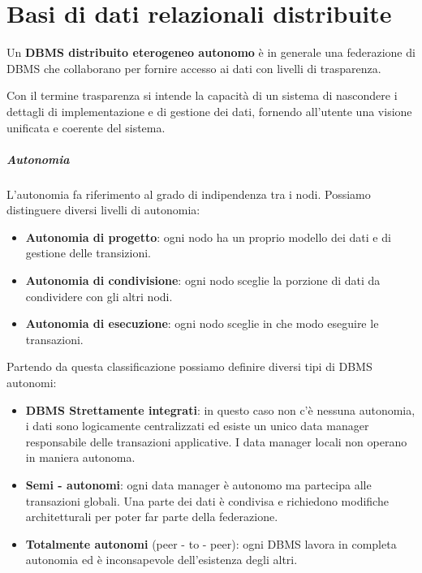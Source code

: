 \chapter{Basi di dati relazionali distribuite}
\begin{definizione}
      Un \textbf{DBMS distribuito eterogeneo autonomo} è in generale una
      federazione di DBMS che collaborano per fornire accesso ai dati con livelli
      di trasparenza.
\end{definizione}
Con il termine trasparenza si intende la capacità di un sistema di
nascondere i dettagli di implementazione e di gestione dei dati, fornendo
all'utente una visione unificata e coerente del sistema.
\paragraph{Autonomia} L'autonomia fa riferimento al grado di indipendenza tra i
nodi. Possiamo distinguere diversi livelli di autonomia:
\begin{itemize}
      \item \textbf{Autonomia di progetto}: ogni nodo ha un proprio modello dei
            dati e di gestione delle transizioni.
      \item \textbf{Autonomia di condivisione}: ogni nodo sceglie la porzione di
            dati da condividere con gli altri nodi.
      \item \textbf{Autonomia di esecuzione}: ogni nodo sceglie in che modo eseguire
            le transazioni.
\end{itemize}
Partendo da questa classificazione possiamo definire diversi tipi di DBMS autonomi:
\begin{itemize}
      \item \textbf{DBMS Strettamente integrati}: in questo caso non c'è nessuna
            autonomia, i dati sono logicamente centralizzati ed esiste un unico
            data manager responsabile delle transazioni applicative. I data
            manager locali non operano in maniera autonoma.
      \item \textbf{Semi - autonomi}: ogni data manager è autonomo ma partecipa
            alle transazioni globali. Una parte dei dati è condivisa e richiedono
            modifiche architetturali per poter far parte della federazione.
      \item \textbf{Totalmente autonomi} (peer - to - peer): ogni DBMS lavora in
            completa autonomia ed è inconsapevole dell'esistenza degli altri.
\end{itemize}

